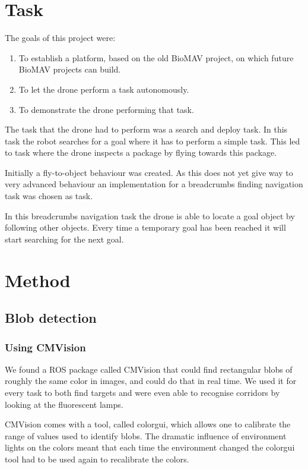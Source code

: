 \documentclass[a4paper,10pt]{article}
\begin{document}
\section{Task}
The goals of this project were:
\begin{enumerate}
\item To establish a platform, based on the old BioMAV project, on which
      future BioMAV projects can build.
\item To let the drone perform a task autonomously. 
\item To demonstrate the drone performing that task.
\end{enumerate}

The task that the drone had to perform was a search and deploy task. In this task the robot searches for a goal where it has to perform a simple task. This led to task where the drone inspects a package by flying towards this package.

Initially a fly-to-object behaviour was created. As this does not yet give way to very advanced behaviour an implementation for a breadcrumbs finding navigation task was chosen as task. 

In this breadcrumbs navigation task the drone is able to locate a goal object by following other objects. 
Every time a temporary goal has been reached it will start searching for the next goal. 
\section{Method}
\subsection{Blob detection}
\label{sec:blobdetection}
\subsubsection{Using CMVision}
We found a ROS package called CMVision that could find rectangular blobs of
roughly the same color in images, and could do that in real time. We used
it for every task to both find targets and were even able to recognise corridors by looking at the fluorescent lamps. 

CMVision comes with a tool, called colorgui, which allows one to calibrate the
range of values used to identify blobs. The dramatic influence of environment
lights on the colors meant that each time the environment changed the colorgui tool had to be used again to recalibrate the colors.
\end{document}
